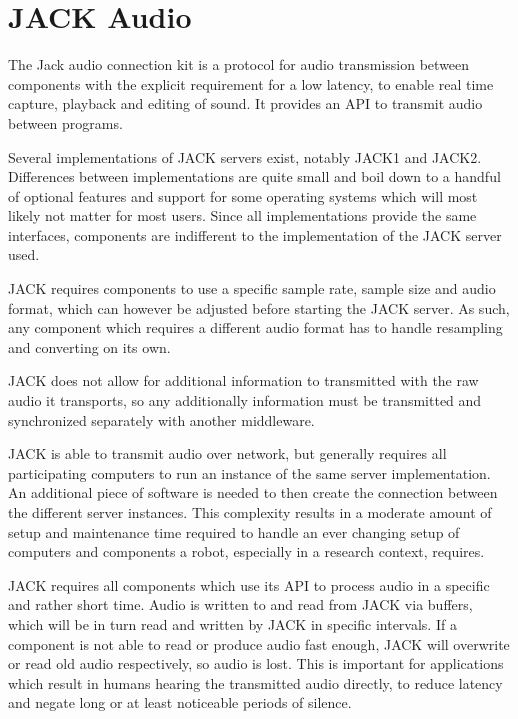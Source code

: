 
\section{JACK Audio}

The Jack audio connection kit \cite{JACK} is a protocol for audio transmission between components with the explicit requirement for a low latency, to enable real time capture, playback and editing of sound. 
It provides an API to transmit audio between programs. 

Several implementations of JACK servers exist, notably JACK1 and JACK2. 
Differences between implementations are quite small and boil down to a handful of optional features and support for some operating systems which will most likely not matter for most users. %
Since all implementations provide the same interfaces, components are indifferent to the implementation of the JACK server used. 

JACK requires components to use a specific sample rate, sample size and audio format, which can however be adjusted before starting the JACK server. 
As such, any component which requires a different audio format has to handle resampling and converting on its own. 

JACK does not allow for additional information to transmitted with the raw audio it transports, so any additionally information must be transmitted and synchronized separately with another middleware. 

JACK is able to transmit audio over network, but generally requires all participating computers to run an instance of the same server implementation. 
An additional piece of software is needed to then create the connection between the different server instances. 
This complexity results in a moderate amount of setup and maintenance time required to handle an ever changing setup of computers and components a robot, especially in a research context, requires.

JACK requires all components which use its API to process audio in a specific and rather short time. 
Audio is written to and read from JACK via buffers, which will be in turn read and written by JACK in specific intervals.
If a component is not able to read or produce audio fast enough, JACK will overwrite or read old audio respectively, so audio is lost. 
This is important for applications which result in humans hearing the transmitted audio directly, to reduce latency and negate long or at least noticeable periods of silence.

